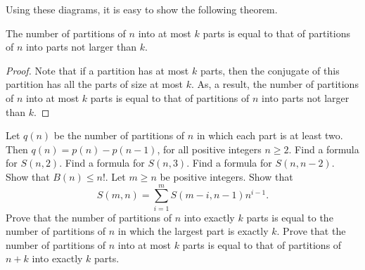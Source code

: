 Using these diagrams, it is easy to show the following theorem.
\begin{theorem}
  The number of partitions of $n$ into at most $k$ parts is equal to that of
  partitions of $n$ into parts not larger than $k$.
\end{theorem}
\begin{proof}
  Note that if a partition has at most $k$ parts, then the conjugate of this
  partition has all the parts of size at most $k$. As, a result, the number
  of partitions of $n$ into at most $k$ parts is equal to that of
  partitions of $n$ into parts not larger than $k$.
\end{proof}

\begin{chapterendexercises}
  \exercise
    Let $q(n)$ be the number of partitions of $n$ in which each part is at least
    two. Then $q(n) = p(n) - p(n - 1)$, for all positive integers $n \ge 2$.
  \exercise[recommended] Find a formula for $S(n, 2)$.
  \exercise Find a formula for $S(n, 3)$.
  \exercise Find a formula for $S(n, n - 2)$.
  \exercise[recommended] Show that $B(n) \le n!$.
  \exercise Let $m \ge n$ be positive integers. Show that
    \[
      S(m, n) = \sum_{i = 1}^m S(m - i, n - 1) n^{i - 1}.
    \]
  \exercise Prove that the number of partitions of $n$ into exactly $k$
    parts is equal to the number of partitions of $n$ in which the
    largest part is exactly $k$.
  \exercise[recommended] Prove that the number of partitions of $n$ into at most $k$
    parts is equal to that of partitions of $n + k$ into exactly $k$ parts.
\end{chapterendexercises}
